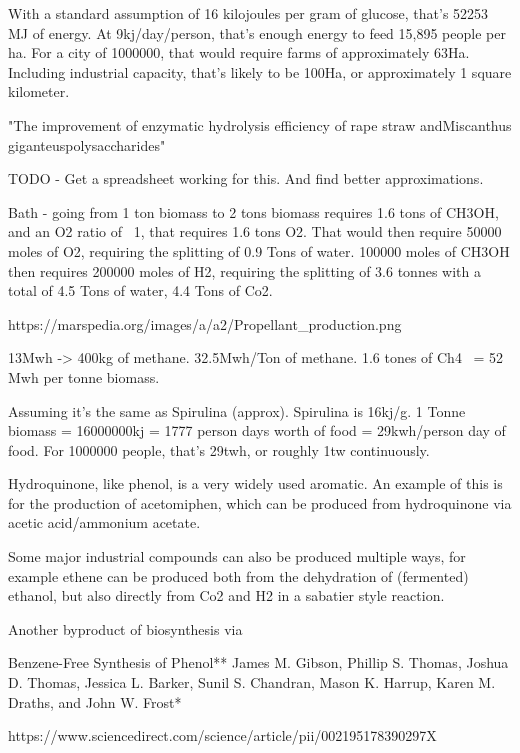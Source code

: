 \documentclass[10pt]{article}
\begin{document}
With a standard assumption of 16 kilojoules per gram of glucose, that's 52253 MJ of energy. At 9kj/day/person, that's enough energy to feed 15,895 people per ha. For a city of 1000000, that would require farms of approximately 63Ha. Including industrial capacity, that's likely to be 100Ha, or approximately 1 square kilometer.

"The improvement of enzymatic hydrolysis efficiency of rape straw andMiscanthus giganteuspolysaccharides"


TODO - Get a spreadsheet working for this. And find better approximations.

Bath - going from 1 ton biomass to 2 tons biomass requires 1.6 tons of CH3OH, and an O2 ratio of ~1, that requires 1.6 tons O2. That would then require 50000 moles of O2, requiring the splitting of 0.9 Tons of water. 100000 moles of CH3OH then requires 200000 moles of H2, requiring the splitting of 3.6 tonnes with a total of 4.5 Tons of water, 4.4 Tons of Co2. 

https://marspedia.org/images/a/a2/Propellant_production.png

13Mwh -> 400kg of methane. 32.5Mwh/Ton of methane. 1.6 tones of Ch4 ~= 52 Mwh per tonne biomass.

Assuming it's the same as Spirulina (approx). Spirulina is 16kj/g. 1 Tonne biomass = 16000000kj = 1777 person days worth of food = 29kwh/person day of food. For 1000000 people, that's 29twh, or roughly 1tw continuously.








Hydroquinone, like phenol, is a very widely used aromatic. An example of this is for the production of acetomiphen, which can be produced from hydroquinone via acetic acid/ammonium acetate.
 

Some major industrial compounds can also be produced multiple ways, for example ethene can be produced both from the dehydration of (fermented) ethanol, but also directly from Co2 and H2 in a sabatier style reaction. 

Another byproduct of biosynthesis via 

Benzene-Free Synthesis of Phenol**
James M. Gibson, Phillip S. Thomas, Joshua D. Thomas,
Jessica L. Barker, Sunil S. Chandran, Mason K. Harrup,
Karen M. Draths, and John W. Frost*

https://www.sciencedirect.com/science/article/pii/002195178390297X
\end{document}
